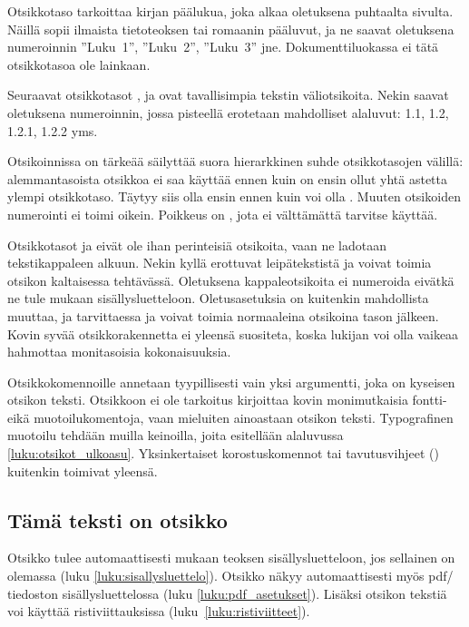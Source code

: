 Otsikkotaso  tarkoittaa kirjan päälukua, joka alkaa
oletuksena puhtaalta sivulta. Näillä sopii ilmaista tietoteoksen tai
romaanin pääluvut, ja ne saavat oletuksena numeroinnin ''Luku~1'',
''Luku~2'', ''Luku~3'' jne. Dokumenttiluokassa  ei tätä
otsikkotasoa ole lainkaan.

Seuraavat otsikkotasot ,  ja
 ovat tavallisimpia tekstin väliotsikoita. Nekin
saavat oletuksena numeroinnin, jossa pisteellä erotetaan mahdolliset
alaluvut: 1.1, 1.2, 1.2.1, 1.2.2 yms.

Otsikoinnissa on tärkeää säilyttää suora hierarkkinen suhde
otsikkotasojen välillä: alemmantasoista otsikkoa ei saa käyttää ennen
kuin on ensin ollut yhtä astetta ylempi otsikkotaso. Täytyy siis olla
ensin  ennen kuin voi olla . Muuten
otsikoiden numerointi ei toimi oikein. Poikkeus on , jota
ei välttämättä tarvitse käyttää.

Otsikkotasot  ja  eivät ole
ihan perinteisiä otsikoita, vaan ne ladotaan tekstikappaleen alkuun.
Nekin kyllä erottuvat leipätekstistä ja voivat toimia otsikon
kaltaisessa tehtävässä. Oletuksena kappaleotsikoita ei numeroida eivätkä
ne tule mukaan sisällysluetteloon. Oletusasetuksia on kuitenkin
mahdollista muuttaa, ja tarvittaessa  ja
 voivat toimia normaaleina otsikoina tason
 jälkeen. Kovin syvää otsikkorakennetta ei
yleensä suositeta, koska lukijan voi olla vaikeaa hahmottaa monitasoisia
kokonaisuuksia.

Otsikkokomennoille annetaan tyypillisesti vain yksi argumentti, joka on
kyseisen otsikon teksti. Otsikkoon ei ole tarkoitus kirjoittaa kovin
monimutkaisia fontti- eikä muotoilukomentoja, vaan mieluiten ainoastaan
otsikon teksti. Typografinen muotoilu tehdään muilla keinoilla, joita
esitellään alaluvussa \ref{luku:otsikot_ulkoasu}. Yksinkertaiset
korostuskomennot tai tavutusvihjeet (\komento{-}) kuitenkin toimivat
yleensä.

\begin{koodilohkosis}
  \section{Tämä teksti on otsikko}
\end{koodilohkosis}

Otsikko tulee automaattisesti mukaan teoksen sisällysluetteloon, jos
sellainen on olemassa (luku \ref{luku:sisallysluettelo}). Otsikko näkyy
automaattisesti myös pdf\-/ tiedoston sisällysluettelossa (luku
\ref{luku:pdf_asetukset}). Lisäksi otsikon tekstiä voi käyttää
ristiviittauksissa (luku~\ref{luku:ristiviitteet}).

